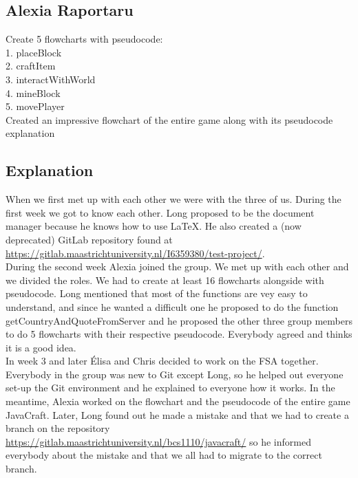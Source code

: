 \subsection{Alexia Raportaru}

Create 5 flowcharts with pseudocode: \\
1. placeBlock \\
2. craftItem \\
3. interactWithWorld \\
4. mineBlock \\
5. movePlayer \\
Created an impressive flowchart of the entire game along with its pseudocode explanation

\subsection{Explanation}

When we first met up with each other we were with the three of us. During the first week we got to know each other. Long proposed to be the document manager because he knows how to use LaTeX. He also created a (now deprecated) GitLab repository found at \url{https://gitlab.maastrichtuniversity.nl/I6359380/test-project/}. \\
During the second week Alexia joined the group. We met up with each other and we divided the roles. We had to create at least 16 flowcharts alongside with pseudocode. Long mentioned that most of the functions are vey easy to understand, and since he wanted a difficult one he proposed to do the function getCountryAndQuoteFromServer and he proposed the other three group members to do 5 flowcharts with their respective pseudocode. Everybody agreed and thinks it is a good idea. \\
In week 3 and later Élisa and Chris decided to work on the FSA together. Everybody in the group was new to Git except Long, so he helped out everyone set-up the Git environment and he explained to everyone how it works.  In the meantime, Alexia worked on the flowchart and the pseudocode of the entire game JavaCraft. Later, Long found out he made a mistake and that we had to create a branch on the repository \url{https://gitlab.maastrichtuniversity.nl/bcs1110/javacraft/} so he informed everybody about the mistake and that we all had to migrate to the correct branch.